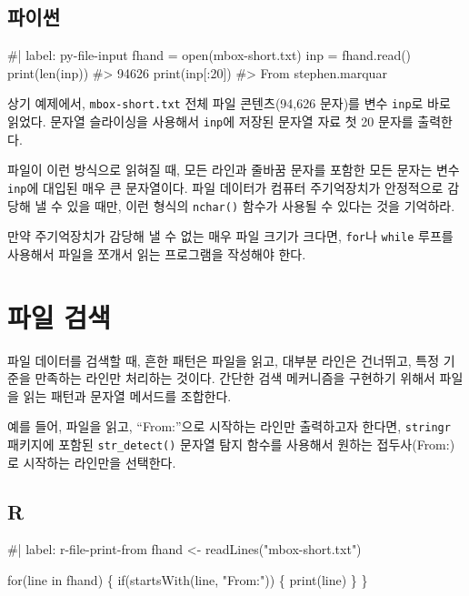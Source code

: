 \documentclass[
  letterpaper,
]{book}
\newenvironment{Shaded}{\begin{snugshade}}{\end{snugshade}}
\newcommand{\NormalTok}[1]{\textcolor[rgb]{0.00,0.23,0.31}{#1}}
\begin{document}
\subsection{파이썬}

\begin{Shaded}
\begin{Highlighting}[]
\NormalTok{\#| label: py{-}file{-}input}
\NormalTok{fhand = open(\textquotesingle{}mbox{-}short.txt\textquotesingle{})}
\NormalTok{inp = fhand.read()}
\NormalTok{print(len(inp))}
\NormalTok{\#\textgreater{} 94626}
\NormalTok{print(inp[:20])}
\NormalTok{\#\textgreater{} From stephen.marquar}
\end{Highlighting}
\end{Shaded}

상기 예제에서, \texttt{mbox-short.txt} 전체 파일 콘텐츠(94,626 문자)를
변수 \texttt{inp}로 바로 읽었다. 문자열 슬라이싱을 사용해서
\texttt{inp}에 저장된 문자열 자료 첫 20 문자를 출력한다.

파일이 이런 방식으로 읽혀질 때, 모든 라인과 줄바꿈 문자를 포함한 모든
문자는 변수 \texttt{inp}에 대입된 매우 큰 문자열이다. 파일 데이터가
컴퓨터 주기억장치가 안정적으로 감당해 낼 수 있을 때만, 이런 형식의
\texttt{nchar()} 함수가 사용될 수 있다는 것을 기억하라.

만약 주기억장치가 감당해 낼 수 없는 매우 파일 크기가 크다면,
\texttt{for}나 \texttt{while} 루프를 사용해서 파일을 쪼개서 읽는
프로그램을 작성해야 한다.

\section{파일 검색}\label{r-file-search}

 

파일 데이터를 검색할 때, 흔한 패턴은 파일을 읽고, 대부분 라인은
건너뛰고, 특정 기준을 만족하는 라인만 처리하는 것이다. 간단한 검색
메커니즘을 구현하기 위해서 파일을 읽는 패턴과 문자열 메서드를 조합한다.

예를 들어, 파일을 읽고, ``From:''으로 시작하는 라인만 출력하고자 한다면,
\texttt{stringr} 패키지에 포함된 \texttt{str\_detect()} 문자열 탐지
함수를 사용해서 원하는 접두사(From:)로 시작하는 라인만을 선택한다.

\subsection{R}

\begin{Shaded}
\begin{Highlighting}[]
\NormalTok{\#| label: r{-}file{-}print{-}from}
\NormalTok{fhand \textless{}{-} readLines("mbox{-}short.txt")}

\NormalTok{for(line in fhand) \{}
\NormalTok{  if(startsWith(line, "From:")) \{}
\NormalTok{    print(line)}
\NormalTok{  \}}
\NormalTok{\}}
\end{Highlighting}
\end{Shaded}
\end{document}
